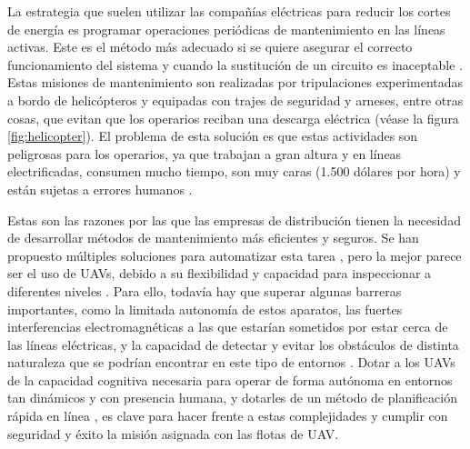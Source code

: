 \documentclass[fontsize=11pt, English=false, Español=true, Myfinal=true, twoside, numbers=noenddot]{scrbook}
\begin{document}
La estrategia que suelen utilizar las compañías eléctricas para reducir los cortes de energía es programar operaciones periódicas de mantenimiento en las líneas activas. Este es el método más adecuado si se quiere asegurar el correcto funcionamiento del sistema y cuando la sustitución de un circuito es inaceptable \cite{PowerOutagesCauses}. Estas misiones de mantenimiento son realizadas por tripulaciones experimentadas a bordo de helicópteros y equipadas con trajes de seguridad y arneses, entre otras cosas, que evitan que los operarios reciban una descarga eléctrica (véase la figura \ref{fig:helicopter}). El problema de esta solución es que estas actividades son peligrosas para los operarios, ya que trabajan a gran altura y en líneas electrificadas, consumen mucho tiempo, son muy caras (1.500 dólares por hora) y están sujetas a errores humanos \cite{MaintenanceCost}.

Estas son las razones por las que las empresas de distribución tienen la necesidad de desarrollar métodos de mantenimiento más eficientes y seguros. Se han propuesto múltiples soluciones para automatizar esta tarea \cite{MaintenanceSolutions}, pero la mejor parece ser el uso de \glspl{UAV}, debido a su flexibilidad y capacidad para inspeccionar a diferentes niveles \cite{PowerOutagesCauses}. Para ello, todavía hay que superar algunas barreras importantes, como la limitada autonomía de estos aparatos, las fuertes interferencias electromagnéticas a las que estarían sometidos por estar cerca de las líneas eléctricas, y la capacidad de detectar y evitar los obstáculos de distinta naturaleza que se podrían encontrar en este tipo de entornos \cite{MaintenanceCost}. Dotar a los \glspl{UAV} de la capacidad cognitiva necesaria para operar de forma autónoma en entornos tan dinámicos y con presencia humana, y dotarles de un método de planificación rápida en línea \cite{FastOnlinePlanning}, es clave para hacer frente a estas complejidades y cumplir con seguridad y éxito la misión asignada con las flotas de \gls{UAV}.
\end{document}
